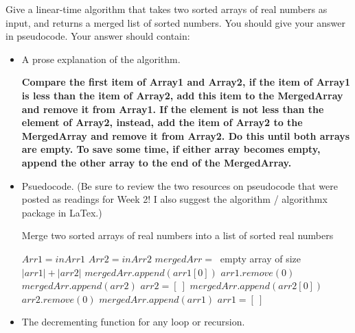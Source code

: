 \documentclass{article}
\author{TODO-Your Group Number and Names Here}
\date{due: 20 September 2019}
\begin{document}
\nextprob
Give a linear-time algorithm that takes two sorted arrays of real numbers as
input, and returns a merged list of sorted numbers.  You should give your answer
in pseudocode.    Your answer should contain:
\begin{itemize}
    \item A prose explanation of the algorithm.
    
    \textbf{ Compare the first item of Array1 and Array2, if the item of Array1 is less than the item of Array2, add this item to the MergedArray and remove it from Array1. If the element is not less than the element of Array2, instead, add the item of Array2 to the MergedArray and remove it from Array2. Do this until both arrays are empty. To save some time, if either array becomes empty, append the other array to the end of the MergedArray. }

    \item Psuedocode. (Be sure to review the two resources on pseudocode that were
        posted as readings for Week 2!  I also suggest the algorithm /
        algorithmx package in LaTex.)
    \begin{algorithm}
        \renewcommand\thealgorithm{}\caption{Merge two sorted arrays of real numbers into a list of sorted real numbers} %
    \end{algorithm}
    \begin{algorithmic}[1]
         
        \State $Arr1 = inArr1$
        \State $Arr2 = inArr2$
        \State $mergedArr = \ $ empty array of size $|arr1| + |arr2|$ 
         
                \State $mergedArr.append(arr1[0])$ 
                \State $arr1.remove(0)$ 
                 
                    \State $mergedArr.append(arr2)$ 
                    \State $arr2 = [ \ ]$
                \EndIf
            \Else
                \State $mergedArr.append(arr2[0])$
                \State $arr2.remove(0)$ 
                 
                    \State $mergedArr.append(arr1)$ 
                    \State $arr1 = [ \ ]$
                \EndIf
            \EndIf
        \EndWhile
        \EndProcedure
    \end{algorithmic}
    \item The decrementing function for any loop or recursion.


\end{itemize}
\end{document}
